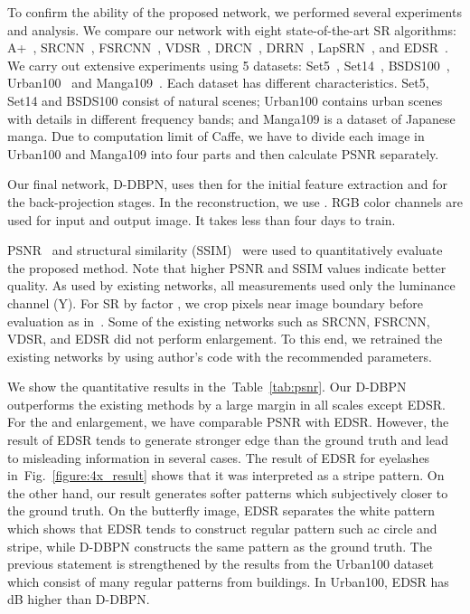 \documentclass[10pt,twocolumn,letterpaper]{article}
\begin{document}
To confirm the ability of the proposed network, we performed several experiments and analysis. We compare our network with eight state-of-the-art SR algorithms: A+~\cite{timofte2014a+}, SRCNN~\cite{dong2016image}, FSRCNN~\cite{dong2016accelerating}, VDSR~\cite{Kim_2016_VDSR}, DRCN~\cite{kim2016deeply}, DRRN~\cite{Tai-DRRN-2017}, LapSRN~\cite{LapSRN}, and EDSR~\cite{Lim_2017_CVPR_Workshops}. We carry out extensive experiments using 5 datasets: Set5~\cite{bevilacqua2012low}, Set14~\cite{zeyde2012single}, BSDS100~\cite{arbelaez2011contour}, Urban100~\cite{huang2015single} and Manga109~\cite{matsui2016sketch}. Each dataset has different characteristics. Set5, Set14 and BSDS100 consist of natural scenes; Urban100 contains urban scenes with details in different frequency bands; and Manga109 is a dataset of Japanese manga. Due to computation limit of Caffe, we have to divide each image in Urban100 and Manga109 into four parts and then calculate PSNR separately.

Our final network, D-DBPN, uses  then  for the initial feature extraction and  for the back-projection stages. In the reconstruction, we use . RGB color channels are used for input and output image. It takes less than four days to train.

PSNR~\cite{irani93} and structural similarity (SSIM)~\cite{wang04}
were used to quantitatively evaluate the proposed method. Note that higher PSNR
and SSIM values indicate better quality. As used by existing networks,
all measurements used only the luminance channel (Y). For SR by factor
, we crop  pixels near image boundary before evaluation as in~\cite{Lim_2017_CVPR_Workshops, dong2016accelerating}. Some of the existing networks such as SRCNN, FSRCNN, VDSR, and EDSR did not perform  enlargement. To this end, we retrained the existing networks by using author's code with the recommended parameters. 

We show the quantitative results in the~Table~\ref{tab:psnr}. Our D-DBPN outperforms the existing methods by a large margin in all scales except EDSR. For the  and  enlargement, we have comparable PSNR with EDSR. However, the result of EDSR tends to generate stronger edge than the ground truth and lead to misleading information in several cases. The result of EDSR for eyelashes in~Fig.~\ref{figure:4x_result} shows that it was interpreted as a stripe pattern. On the other hand, our result generates softer patterns which subjectively closer to the ground truth. On the butterfly image, EDSR separates the white pattern which shows that EDSR tends to construct regular pattern such ac circle and stripe, while D-DBPN constructs the same pattern as the ground truth. The previous statement is strengthened by the results from the Urban100 dataset which consist of many regular patterns from buildings. In Urban100, EDSR has  dB higher than D-DBPN.
\end{document}
